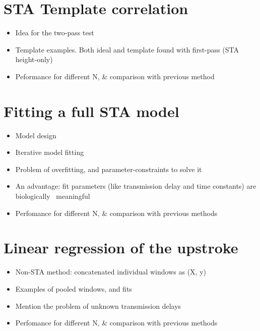 


\section{STA Template correlation}

\begin{itemize}
    \item Idea for the two-pass test
    \item Template examples. Both ideal and template found with first-pass (STA height-only)
    \item Peformance for different N, \& comparison with previous method
\end{itemize}



\section{Fitting a full STA model}

\begin{itemize}
    \item Model design
    \item Iterative model fitting
    \item Problem of overfitting, and parameter-constraints to solve it
    \item An advantage: fit parameters (like transmission delay and time constants) are biologically ~meaningful
    \item Perfomance for different N, \& comparison with previous methods
\end{itemize}


\section{Linear regression of the upstroke}

\begin{itemize}
    \item Non-STA method: concatenated individual windows as (X, y)
    \item Examples of pooled windows, and fits
    \item Mention the problem of unknown transmission delays
    \item Perfomance for different N, \& comparison with previous methods
\end{itemize}



